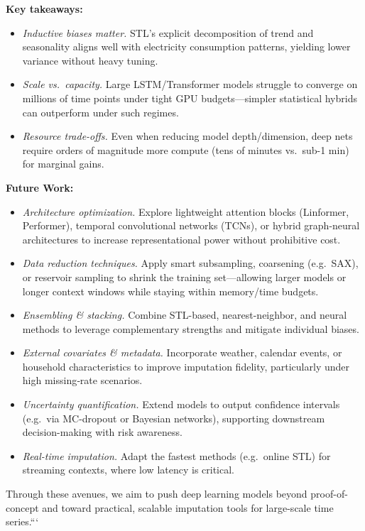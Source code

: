 \documentclass[10pt,twocolumn]{article}
\begin{document}
	\vspace{1ex}
	\noindent\textbf{Key takeaways:}
	\begin{itemize}
		\item \emph{Inductive biases matter.} STL’s explicit decomposition of trend and seasonality aligns well with electricity consumption patterns, yielding lower variance without heavy tuning.
		\item \emph{Scale vs.\ capacity.} Large LSTM/Transformer models struggle to converge on millions of time points under tight GPU budgets—simpler statistical hybrids can outperform under such regimes.
		\item \emph{Resource trade-offs.} Even when reducing model depth/dimension, deep nets require orders of magnitude more compute (tens of minutes vs.\ sub-1 min) for marginal gains.
	\end{itemize}
	
	\vspace{1ex}
	\noindent\textbf{Future Work:}
	\begin{itemize}
		\item \emph{Architecture optimization.} Explore lightweight attention blocks (Linformer, Performer), temporal convolutional networks (TCNs), or hybrid graph-neural architectures to increase representational power without prohibitive cost.
		\item \emph{Data reduction techniques.} Apply smart subsampling, coarsening (e.g.\ SAX), or reservoir sampling to shrink the training set—allowing larger models or longer context windows while staying within memory/time budgets.
		\item \emph{Ensembling \& stacking.} Combine STL-based, nearest-neighbor, and neural methods to leverage complementary strengths and mitigate individual biases.
		\item \emph{External covariates \& metadata.} Incorporate weather, calendar events, or household characteristics to improve imputation fidelity, particularly under high missing‐rate scenarios.
		\item \emph{Uncertainty quantification.} Extend models to output confidence intervals (e.g.\ via MC-dropout or Bayesian networks), supporting downstream decision-making with risk awareness.
		\item \emph{Real-time imputation.} Adapt the fastest methods (e.g.\ online STL) for streaming contexts, where low latency is critical.
	\end{itemize}
	
	Through these avenues, we aim to push deep learning models beyond proof-of-concept and toward practical, scalable imputation tools for large-scale time series.```
	
\end{document}
